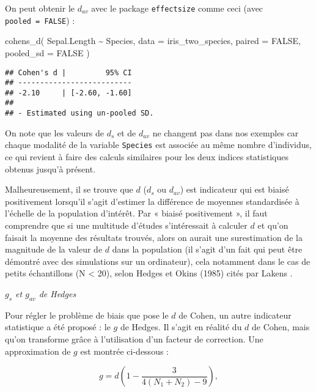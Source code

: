 \documentclass[
]{book}
\newenvironment{Shaded}{\begin{snugshade}}{\end{snugshade}}
\newcommand{\AttributeTok}[1]{\textcolor[rgb]{0.77,0.63,0.00}{#1}}
\newcommand{\ConstantTok}[1]{\textcolor[rgb]{0.00,0.00,0.00}{#1}}
\newcommand{\FunctionTok}[1]{\textcolor[rgb]{0.00,0.00,0.00}{#1}}
\newcommand{\NormalTok}[1]{#1}
\newcommand{\SpecialCharTok}[1]{\textcolor[rgb]{0.00,0.00,0.00}{#1}}
\begin{document}
On peut obtenir le \(d_{av}\) avec le package \texttt{effectsize} comme ceci (avec \texttt{pooled\ =\ FALSE}) :

\begin{Shaded}
\begin{Highlighting}[]
\FunctionTok{cohens\_d}\NormalTok{(}
\NormalTok{  Sepal.Length }\SpecialCharTok{\textasciitilde{}}\NormalTok{ Species, }
  \AttributeTok{data =}\NormalTok{ iris\_two\_species, }
  \AttributeTok{paired =} \ConstantTok{FALSE}\NormalTok{, }
  \AttributeTok{pooled\_sd =} \ConstantTok{FALSE}
\NormalTok{  )}
\end{Highlighting}
\end{Shaded}

\begin{verbatim}
## Cohen's d |         95% CI
## --------------------------
## -2.10     | [-2.60, -1.60]
## 
## - Estimated using un-pooled SD.
\end{verbatim}

On note que les valeurs de \(d_s\) et de \(d_{av}\) ne changent pas dans nos exemples car chaque modalité de la variable \texttt{Species} est associée au même nombre d'individus, ce qui revient à faire des calculs similaires pour les deux indices statistiques obtenus jusqu'à présent.

Malheureusement, il se trouve que \(d\) (\(d_s\) ou \(d_{av}\)) est indicateur qui est biaisé positivement lorsqu'il s'agit d'estimer la différence de moyennes standardisée à l'échelle de la population d'intérêt. Par « biaisé positivement », il faut comprendre que si une multitude d'études s'intéressait à calculer \(d\) et qu'on faisait la moyenne des résultats trouvés, alors on aurait une surestimation de la magnitude de la valeur de \(d\) dans la population (il s'agit d'un fait qui peut être démontré avec des simulations sur un ordinateur), cela notamment dans le cas de petits échantillons (N \textless{} 20), selon Hedges et Okins (1985) cités par Lakens \autocite*{lakensCalculatingReportingEffect2013}.

\emph{\(g_{s}\) et \(g_{av}\) de Hedges}

Pour régler le problème de biais que pose le \(d\) de Cohen, un autre indicateur statistique a été proposé : le \(g\) de Hedges. Il s'agit en réalité du \(d\) de Cohen, mais qu'on transforme grâce à l'utilisation d'un facteur de correction. Une approximation de \(g\) est montrée ci-dessous \autocite*{lakensCalculatingReportingEffect2013} :

\[g = d (1 - \frac{3}{4(N_{1} + N_{2}) - 9}),\]
\end{document}
